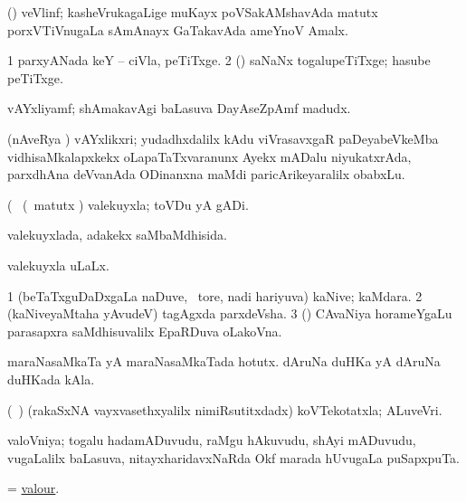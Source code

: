 \bentry
{} 
\gl{\nA}
\expl{}
\bmng
 (\jiVra) veVlinf; kasheVrukagaLige muKayx poVSakAMshavAda matutx porxVTiVnugaLa sAmAnayx GaTakavAda ameYnoV Amalx. 
\emng
\eentry

\bentry
{} 
\gl{\nA}
\expl{}
\bmng
\bnum
\num{1} parxyANada keY -- ciVla, peTiTxge. 
\num{2} (\ame) saNaNx togalupeTiTxge; hasube peTiTxge. 
\enum
\emng
\eentry

\bentry
{} 
\gl{\nA}
\expl{(\P)}
\bmng
vAYxliyamf; shAmakavAgi baLasuva DayAseZpAmf madudx. 
\emng
\eentry

\bentry
{} 
\gl{\nA}
\expl{}
\bmng
 (nAveRya \pu) vAYxlikxri; yudadhxdalilx kAdu viVrasavxgaR paDeyabeVkeMba vidhisaMkalapxkekx oLapaTaTxvaranunx Ayekx mADalu niyukatxrAda, parxdhAna deVvanAda ODinanxna  maMdi paricArikeyaralilx obabxLu. 
\emng
\eentry

\bentry
{} 
\gl{\nA}(\bava\ 
\bmng
(\aMrashA\ matutx \savi) valekuyxla; toVDu yA gADi. 
\emng
\eentry

\bentry
{} 
\gl{\gu}
\expl{}
\bmng
valekuyxlada, adakekx saMbaMdhisida. 
\emng
\eentry

\bentry
{} 
\gl{\gu}
\expl{}
\bmng
valekuyxla uLaLx. 
\emng
\eentry

\bentry
{} 
\gl{\nA}
\bmng
\bnum
\num{1} (beTaTxguDaDxgaLa naDuve, \sA\ tore, nadi hariyuva) kaNive; kaMdara. 
\num{2} (kaNiveyaMtaha yAvudeV) tagAgxda parxdeVsha. 
\num{3} (\vAshi) CAvaNiya horameYgaLu parasapxra saMdhisuvalilx EpaRDuva oLakoVna. 
\enum
\emng

\noindent 
\gl{\pagu}
\expl{}
\bmng
\banum
{} maraNasaMkaTa yA maraNasaMkaTada hotutx. 
 dAruNa duHKa yA dAruNa duHKada kAla. 
\eanum
\emng
\eentry

\bentry 
{} 
\gl{\nA}
\expl{}
\bmng
 (\roV\ \pArxca) (rakaSxNA vayxvasethxyalilx nimiRsutitxdadx) koVTekotatxla; ALuveVri. 
\emng
\eentry

\bentry
{} 
\gl{\nA}
\expl{}
\bmng
 valoVniya; togalu hadamADuvudu, raMgu hAkuvudu, shAyi mADuvudu, \mo vugaLalilx baLasuva, nitayxharidavxNaRda Okf marada hUvugaLa puSapxpuTa. 
\emng
\eentry

\bentry
{} 
\gl{\nA}
\expl{}
\bmng
 = \hyperlink{valour}{valour}. 
\emng
\eentry

